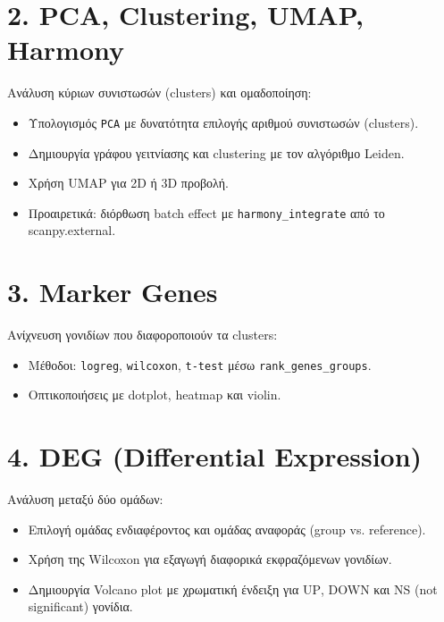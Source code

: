 \section*{2. \foreignlanguage{english}{PCA, Clustering, UMAP, Harmony}}
Ανάλυση κύριων συνιστωσών \foreignlanguage{english}{(clusters)}  και ομαδοποίηση:
\begin{itemize}
  \item Υπολογισμός \foreignlanguage{english}{\texttt{PCA}} με δυνατότητα επιλογής αριθμού συνιστωσών \foreignlanguage{english}{(clusters)}.
  \item Δημιουργία γράφου γειτνίασης και \foreignlanguage{english}{clustering} με τον αλγόριθμο \foreignlanguage{english}{Leiden}.
  \item Χρήση \foreignlanguage{english}{UMAP} για \foreignlanguage{english}{2D ή 3D} προβολή.
  \item Προαιρετικά: διόρθωση \foreignlanguage{english}{batch effect} με \foreignlanguage{english}{\texttt{harmony\_integrate}} από το \foreignlanguage{english}{scanpy.external}.
\end{itemize}

\section*{3. \foreignlanguage{english}{Marker Genes}}
Ανίχνευση γονιδίων που διαφοροποιούν τα \foreignlanguage{english}{clusters}:
\begin{itemize}
  \item Μέθοδοι: \foreignlanguage{english}{\texttt{logreg}}, \foreignlanguage{english}{\texttt{wilcoxon}}, \foreignlanguage{english}{\texttt{t-test}} μέσω \foreignlanguage{english}{\texttt{rank\_genes\_groups}}.
  \item Οπτικοποιήσεις με \foreignlanguage{english}{dotplot}, \foreignlanguage{english}{heatmap} και \foreignlanguage{english}{violin}.
\end{itemize}

\section*{4. \foreignlanguage{english}{DEG (Differential Expression)}}
Ανάλυση μεταξύ δύο ομάδων:
\begin{itemize}
  \item Επιλογή ομάδας ενδιαφέροντος και ομάδας αναφοράς (\foreignlanguage{english}{group vs. reference}).
  \item Χρήση της \foreignlanguage{english}{Wilcoxon} για εξαγωγή διαφορικά εκφραζόμενων γονιδίων.
  \item Δημιουργία \foreignlanguage{english}{Volcano plot} με χρωματική ένδειξη για \foreignlanguage{english}{UP}, \foreignlanguage{english}{DOWN} και \foreignlanguage{english}{NS (not significant)} γονίδια.
\end{itemize}

